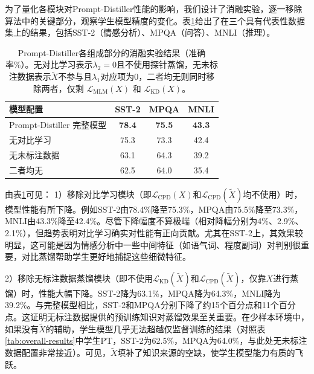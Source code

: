 \documentclass[../main.tex]{subfiles}
\begin{document}
\label{sec:3-5-3}
为了量化各模块对Prompt-Distiller性能的影响，我们设计了消融实验，逐一移除算法中的关键部分，观察学生模型精度的变化。表\ref{tab:ablation-results}给出了在三个具有代表性数据集上的结果，包括SST-2（情感分析）、MPQA（问答）、MNLI（推理）。

\begin{table}[htbp]
	\centering
	\caption{Prompt-Distiller各组成部分的消融实验结果（准确率\%）。无对比学习表示$\lambda_2=0$且不使用探针蒸馏，无未标注数据表示$\tilde{X}$不参与且$\lambda_1$对应项为0，二者均无则同时移除两者，仅剩 $\mathcal{L}_{\text{MLM}}(X)$ 和 $\mathcal{L}_{\text{KD}}(X)$。}
	\label{tab:ablation-results}
	\small\begin{tabular}{l|ccc}
		\toprule[1pt]
		\textbf{模型配置}         & \textbf{SST-2} & \textbf{MPQA} & \textbf{MNLI} \\
		\midrule[0.5pt]
		Prompt-Distiller 完整模型 & \textbf{78.4}  & \textbf{75.5} & \textbf{43.3} \\
		\midrule[0.5pt]
		无对比学习                 & 75.3           & 73.3          & 42.4          \\
		无未标注数据                & 63.1           & 64.3          & 39.2          \\
		二者均无                  & 62.5           & 64.0          & 35.4          \\
		\bottomrule[1pt]
	\end{tabular}
\end{table}

由表\ref{tab:ablation-results}可见：
1）移除对比学习模块（即$\mathcal{L}_{\text{CPD}}(X)$和$\mathcal{L}_{\text{CPD}}(\tilde{X})$均不使用）时，模型性能有所下降。例如SST-2由78.4\%降至75.3\%，MPQA由75.5\%降至73.3\%，MNLI由43.3\%降至42.4\%。尽管下降幅度不算极端（相对降幅分别为4\%、2.9\%、2.1\%），但趋势表明对比学习确实对性能有正向贡献。尤其在SST-2上，其效果较明显，这可能是因为情感分析中一些中间特征（如语气词、程度副词）对判别很重要，对比蒸馏帮助学生更好地捕捉这些细微特征。

2）移除无标注数据蒸馏模块（即不使用$\mathcal{L}_{\text{KD}}(\tilde{X})$和$\mathcal{L}_{\text{CPD}}(\tilde{X})$，仅靠$X$进行蒸馏）时，性能大幅下降。SST-2降为63.1\%，MPQA降为64.3\%，MNLI降为39.2\%。与完整模型相比，SST-2和MPQA分别下降了约15个百分点和11个百分点。这证明无标注数据提供的预训练知识对蒸馏效果至关重要。在少样本环境中，如果没有$\tilde{X}$的辅助，学生模型几乎无法超越仅监督训练的结果（对照表\ref{tab:overall-results}中学生PT，SST-2为62.5\%，MPQA为64.0\%，与此处无未标注数据配置非常接近）。可见，$\tilde{X}$填补了知识来源的空缺，使学生模型能力有质的飞跃。
\end{document}
